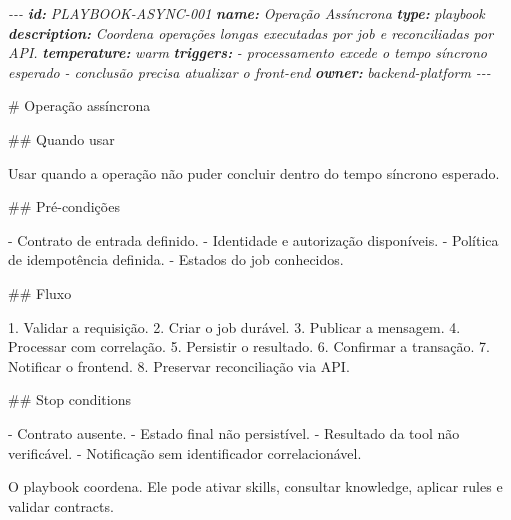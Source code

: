 \documentclass[
  10pt,
  a4paper,
  oneside]{book}
\newenvironment{Shaded}{}{}
\newcommand{\AnnotationTok}[1]{\textcolor[rgb]{0.38,0.63,0.69}{\textbf{\textit{#1}}}}
\newcommand{\CommentTok}[1]{\textcolor[rgb]{0.38,0.63,0.69}{\textit{#1}}}
\newcommand{\FunctionTok}[1]{\textcolor[rgb]{0.02,0.16,0.49}{#1}}
\newcommand{\NormalTok}[1]{#1}
\newcommand{\SpecialStringTok}[1]{\textcolor[rgb]{0.73,0.40,0.53}{#1}}
\begin{document}
\begin{Shaded}
\begin{Highlighting}[]
\CommentTok{{-}{-}{-}}
\AnnotationTok{id:}\CommentTok{ PLAYBOOK{-}ASYNC{-}001}
\AnnotationTok{name:}\CommentTok{ Operação Assíncrona}
\AnnotationTok{type:}\CommentTok{ playbook}
\AnnotationTok{description:}\CommentTok{ Coordena operações longas executadas por job e reconciliadas por API.}
\AnnotationTok{temperature:}\CommentTok{ warm}
\AnnotationTok{triggers:}
\CommentTok{  {-} processamento excede o tempo síncrono esperado}
\CommentTok{  {-} conclusão precisa atualizar o front{-}end}
\AnnotationTok{owner:}\CommentTok{ backend{-}platform}
\CommentTok{{-}{-}{-}}

\FunctionTok{\# Operação assíncrona}

\FunctionTok{\#\# Quando usar}

\NormalTok{Usar quando a operação não puder concluir dentro do tempo síncrono esperado.}

\FunctionTok{\#\# Pré{-}condições}

\SpecialStringTok{{-} }\NormalTok{Contrato de entrada definido.}
\SpecialStringTok{{-} }\NormalTok{Identidade e autorização disponíveis.}
\SpecialStringTok{{-} }\NormalTok{Política de idempotência definida.}
\SpecialStringTok{{-} }\NormalTok{Estados do job conhecidos.}

\FunctionTok{\#\# Fluxo}

\SpecialStringTok{1. }\NormalTok{Validar a requisição.}
\SpecialStringTok{2. }\NormalTok{Criar o job durável.}
\SpecialStringTok{3. }\NormalTok{Publicar a mensagem.}
\SpecialStringTok{4. }\NormalTok{Processar com correlação.}
\SpecialStringTok{5. }\NormalTok{Persistir o resultado.}
\SpecialStringTok{6. }\NormalTok{Confirmar a transação.}
\SpecialStringTok{7. }\NormalTok{Notificar o frontend.}
\SpecialStringTok{8. }\NormalTok{Preservar reconciliação via API.}

\FunctionTok{\#\# Stop conditions}

\SpecialStringTok{{-} }\NormalTok{Contrato ausente.}
\SpecialStringTok{{-} }\NormalTok{Estado final não persistível.}
\SpecialStringTok{{-} }\NormalTok{Resultado da tool não verificável.}
\SpecialStringTok{{-} }\NormalTok{Notificação sem identificador correlacionável.}
\end{Highlighting}
\end{Shaded}

O playbook coordena. Ele pode ativar skills, consultar knowledge,
aplicar rules e validar contracts.
\end{document}
